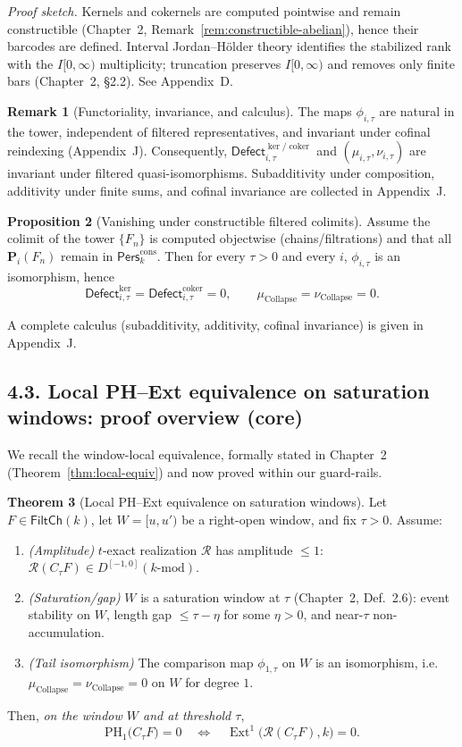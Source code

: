 \documentclass[11pt]{article}
\numberwithin{equation}{section}
\theoremstyle{plain}
\theoremstyle{definition}
\theoremstyle{remark}
\DeclareMathOperator{\Ext}{Ext}
\newcommand{\Pers}{\mathsf{Pers}}
\theoremstyle{plain}
\theoremstyle{definition}
\numberwithin{equation}{section}
\newtheorem{theorem}{Theorem}[section]
\newtheorem{proposition}[theorem]{Proposition}
\theoremstyle{definition}
\newtheorem{remark}[theorem]{Remark}
\DeclareRobustCommand{\muc}{\mu_{\mathrm{Collapse}}}
\DeclareRobustCommand{\nuc}{\nu_{\mathrm{Collapse}}}
\numberwithin{equation}{section}
\theoremstyle{plain}
\theoremstyle{definition}
\theoremstyle{remark}
\DeclareMathOperator{\coker}{coker} %
\providecommand{\Defect}{\mathsf{Defect}}
\providecommand{\muc}{\mu_{\mathrm{Collapse}}}
\providecommand{\nuc}{\nu_{\mathrm{Collapse}}}
\begin{document}
\noindent\emph{Proof sketch.} Kernels and cokernels are computed pointwise and remain constructible (Chapter~2, Remark~\ref{rem:constructible-abelian}), hence their barcodes are defined. Interval Jordan–Hölder theory identifies the stabilized rank with the $I[0,\infty)$ multiplicity; truncation preserves $I[0,\infty)$ and removes only finite bars (Chapter~2, §2.2). See Appendix~D.

\begin{remark}[Functoriality, invariance, and calculus]
The maps $\phi_{i,\tau}$ are natural in the tower, independent of filtered representatives, and invariant under cofinal reindexing (Appendix~J). Consequently, $\Defect_{i,\tau}^{\ker/\coker}$ and $(\mu_{i,\tau},\nu_{i,\tau})$ are invariant under filtered quasi-isomorphisms. Subadditivity under composition, additivity under finite sums, and cofinal invariance are collected in Appendix~J.
\end{remark}

\begin{proposition}[Vanishing under constructible filtered colimits]\label{prop:mu-vanishing}
Assume the colimit of the tower $\{F_n\}$ is computed objectwise (chains/filtrations) and that all $\mathbf{P}_i(F_n)$ remain in $\Pers^{\mathrm{cons}}_k$. Then for every $\tau>0$ and every $i$, $\phi_{i,\tau}$ is an isomorphism, hence
\[
\Defect_{i,\tau}^{\ker}=\Defect_{i,\tau}^{\coker}=0,\qquad \muc=\nuc=0.
\]
\end{proposition}

\noindent A complete calculus (subadditivity, additivity, cofinal invariance) is given in Appendix~J.

\subsection*{4.3. Local PH–Ext equivalence on saturation windows: proof overview (core)}
We recall the window-local equivalence, formally stated in Chapter~2 (Theorem~\ref{thm:local-equiv}) and now proved within our guard-rails.

\begin{theorem}[Local PH–Ext equivalence on saturation windows]\label{thm:ch4-local-equiv}
Let $F\in\mathsf{FiltCh}(k)$, let $W=[u,u')$ be a right-open window, and fix $\tau>0$. Assume:
\begin{enumerate}
  \item \emph{(Amplitude)} $t$-exact realization $\mathcal{R}$ has amplitude $\le 1$: $\mathcal{R}(C_\tau F)\in D^{[-1,0]}(k\text{-mod})$.
  \item \emph{(Saturation/gap)} $W$ is a saturation window at $\tau$ (Chapter~2, Def.~2.6): event stability on $W$, length gap $\le \tau-\eta$ for some $\eta>0$, and near-$\tau$ non-accumulation.
  \item \emph{(Tail isomorphism)} The comparison map $\phi_{1,\tau}$ on $W$ is an isomorphism, i.e.\ $\mu_{\mathrm{Collapse}}=\nu_{\mathrm{Collapse}}=0$ on $W$ for degree $1$.
\end{enumerate}
Then, \emph{on the window $W$ and at threshold $\tau$},
\[
\mathrm{PH}_1\!\big(C_\tau F\big)=0\quad\Longleftrightarrow\quad \Ext^1\!\big(\mathcal{R}(C_\tau F),k\big)=0.
\]
\end{theorem}
\end{document}
